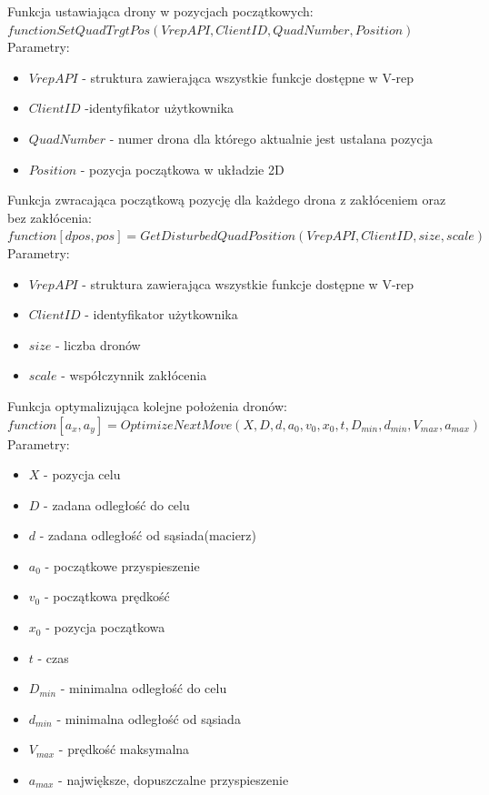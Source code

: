 \documentclass[a4paper, 11pt, oneside]{article}
\begin{document}
Funkcja ustawiająca drony w pozycjach początkowych:
\newline
$function SetQuadTrgtPos(VrepAPI, ClientID, QuadNumber, Position)$
\newline
Parametry:
\begin{itemize}
\item $VrepAPI$ - struktura zawierająca wszystkie funkcje dostępne w V-rep
\item $ClientID$ -identyfikator użytkownika
\item $QuadNumber$ - numer drona dla którego aktualnie jest ustalana pozycja 
\item $Position$ - pozycja początkowa w układzie 2D
\end{itemize}
Funkcja zwracająca początkową pozycję dla każdego drona z zakłóceniem oraz bez zakłócenia:
\newline
$function [dpos, pos]=GetDisturbedQuadPosition(VrepAPI, ClientID, size, scale)$
\newline
Parametry:
\begin{itemize}
\item $VrepAPI$ - struktura zawierająca wszystkie funkcje dostępne w V-rep
\item $ClientID$ - identyfikator użytkownika
\item $size$ - liczba dronów 
\item $scale$ - współczynnik zakłócenia
\end{itemize}

Funkcja optymalizująca kolejne położenia dronów:
\newline
$function [a_x,a_y]=OptimizeNextMove(X,D,d,a_{0},v_{0},x_{0},t,D_{min},d_{min},V_{max},a_{max})$
\newline
Parametry:
\begin{itemize}
\item $X$ - pozycja celu
\item $D$ - zadana odległość do celu
\item $d$ - zadana odległość od sąsiada(macierz)
\item $a_{0}$ - początkowe przyspieszenie
\item $v_{0}$ - początkowa prędkość
\item $x_{0}$ - pozycja początkowa
\item $t$ -  czas
\item $D_{min}$ - minimalna odległość do celu
\item $d_{min}$ - minimalna odległość od sąsiada
\item $V_{max}$ - prędkość maksymalna
\item $a_{max}$ - największe, dopuszczalne przyspieszenie 
\end{itemize}
\end{document}
